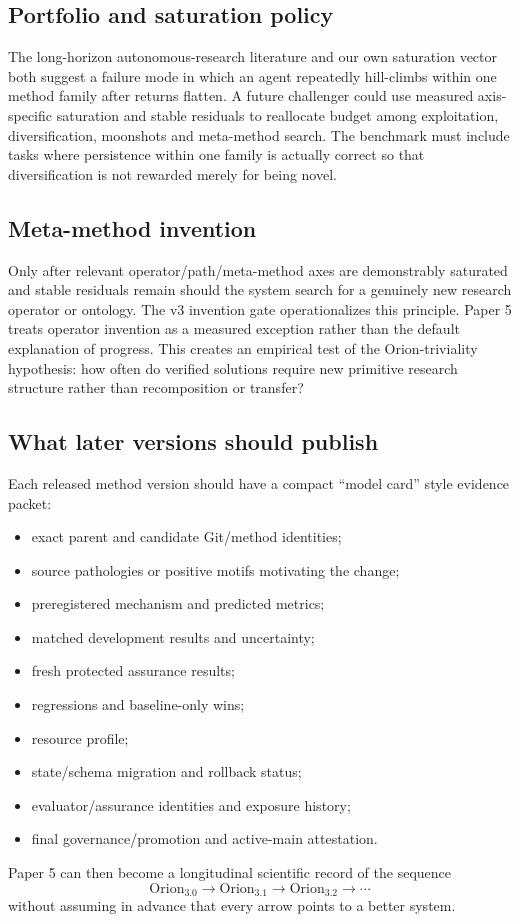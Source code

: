 \subsection{Portfolio and saturation policy}

The long-horizon autonomous-research literature and our own saturation vector both suggest a failure mode in which an agent repeatedly hill-climbs within one method family after returns flatten. A future challenger could use measured axis-specific saturation and stable residuals to reallocate budget among exploitation, diversification, moonshots and meta-method search. The benchmark must include tasks where persistence within one family is actually correct so that diversification is not rewarded merely for being novel.

\subsection{Meta-method invention}

Only after relevant operator/path/meta-method axes are demonstrably saturated and stable residuals remain should the system search for a genuinely new research operator or ontology. The v3 invention gate operationalizes this principle. Paper 5 treats operator invention as a measured exception rather than the default explanation of progress. This creates an empirical test of the Orion-triviality hypothesis: how often do verified solutions require new primitive research structure rather than recomposition or transfer?

\subsection{What later versions should publish}

Each released method version should have a compact ``model card'' style evidence packet:

\begin{itemize}[leftmargin=*]
\item exact parent and candidate Git/method identities;
\item source pathologies or positive motifs motivating the change;
\item preregistered mechanism and predicted metrics;
\item matched development results and uncertainty;
\item fresh protected assurance results;
\item regressions and baseline-only wins;
\item resource profile;
\item state/schema migration and rollback status;
\item evaluator/assurance identities and exposure history;
\item final governance/promotion and active-main attestation.
\end{itemize}

Paper 5 can then become a longitudinal scientific record of the sequence
\[
\mathrm{Orion}_{3.0}\rightarrow \mathrm{Orion}_{3.1}\rightarrow \mathrm{Orion}_{3.2}\rightarrow\cdots
\]
without assuming in advance that every arrow points to a better system.